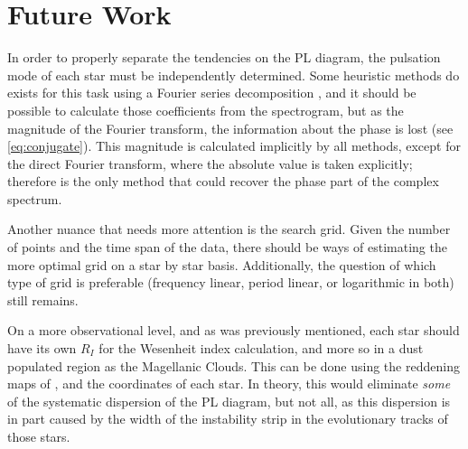 \section{Future Work}

In order to properly separate the tendencies on the PL diagram, the pulsation mode of each star must be independently determined.
Some heuristic methods do exists for this task using a Fourier series decomposition \citep{Zabolotski2005}, 
and it should be possible to calculate those coefficients from the spectrogram,
but as the magnitude of the Fourier transform, the information about the phase is lost (see \autoref{eq:conjugate}).
This magnitude is calculated implicitly by all methods, except for the direct Fourier transform, where the absolute value is taken explicitly;
therefore is the only method that could recover the phase part of the complex spectrum.

Another nuance that needs more attention is the search grid. 
Given the number of points and the time span of the data, 
there should be ways of estimating the more optimal grid on a star by star basis.
Additionally, the question of which type of grid is preferable (frequency linear, period linear, or logarithmic in both) still remains.

On a more observational level, and as was previously mentioned, 
each star should have its own $R_I$ for the Wesenheit index calculation, and more so in a dust populated region as the Magellanic Clouds.
This can be done using the reddening maps of \cite{Reddening2021}, and the coordinates of each star.
In theory, this would eliminate \textit{some} of the systematic dispersion of the PL diagram,
but not all, as this dispersion is in part caused by the width of the instability strip in the evolutionary tracks of those stars.





